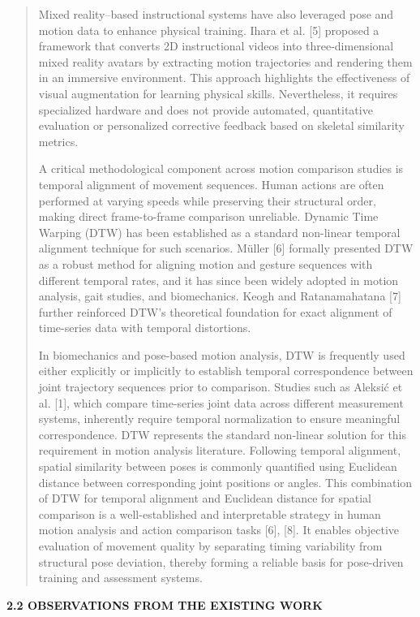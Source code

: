 \documentclass[
]{article}
\begin{document}
\begin{quote}
Mixed reality--based instructional systems have also leveraged pose and
motion data to enhance physical training. Ihara et al. {[}5{]} proposed
a framework that converts 2D instructional videos into three-dimensional
mixed reality avatars by extracting motion trajectories and rendering
them in an immersive environment. This approach highlights the
effectiveness of visual augmentation for learning physical skills.
Nevertheless, it requires specialized hardware and does not provide
automated, quantitative evaluation or personalized corrective feedback
based on skeletal similarity metrics.

A critical methodological component across motion comparison studies is
temporal alignment of movement sequences. Human actions are often
performed at varying speeds while preserving their structural order,
making direct frame-to-frame comparison unreliable. Dynamic Time Warping
(DTW) has been established as a standard non-linear temporal alignment
technique for such scenarios. Müller {[}6{]} formally presented DTW as a
robust method for aligning motion and gesture sequences with different
temporal rates, and it has since been widely adopted in motion analysis,
gait studies, and biomechanics. Keogh and Ratanamahatana {[}7{]} further
reinforced DTW's theoretical foundation for exact alignment of
time-series data with temporal distortions.

In biomechanics and pose-based motion analysis, DTW is frequently used
either explicitly or implicitly to establish temporal correspondence
between joint trajectory sequences prior to comparison. Studies such as
Aleksić et al. {[}1{]}, which compare time-series joint data across
different measurement systems, inherently require temporal normalization
to ensure meaningful correspondence. DTW represents the standard
non-linear solution for this requirement in motion analysis literature.
Following temporal alignment, spatial similarity between poses is
commonly quantified using Euclidean distance between corresponding joint
positions or angles. This combination of DTW for temporal alignment and
Euclidean distance for spatial comparison is a well-established and
interpretable strategy in human motion analysis and action comparison
tasks {[}6{]}, {[}8{]}. It enables objective evaluation of movement
quality by separating timing variability from structural pose deviation,
thereby forming a reliable basis for pose-driven training and assessment
systems.
\end{quote}

\textbf{2.2 OBSERVATIONS FROM THE EXISTING WORK}
\end{document}
